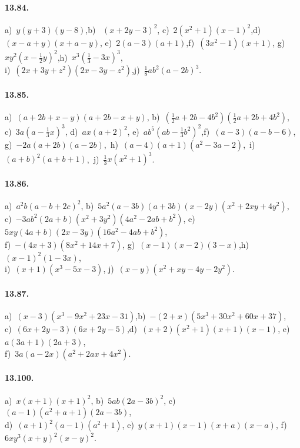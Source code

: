 \paragraph{13.84.} a)~$y(y+3)(y-8)$,\quad b)~ $(x+2y-3)^{2}$,\quad
c)~$2(x^{2}+1)(x-1)^{2}$,\quad d)~$(x-a+y)(x+a-y)$,\quad
e)~$2(a-3)(a+1)$,\quad f)~$(3x^{2}-1)(x+1)$,\quad
g)~$xy^{2}(x-\frac{1}{2}y)^{2}$,\quad h)~$x^{3}\left(\frac{1}{3}-3x\right)^{3}$,\protect\\
i)~$(2x+3y+z^{2})(2x-3y-z^{2})$,\quad j)~$\frac{1}{8}{ab}^{2}(a-2b)^{3}$.

\paragraph{13.85.} a)~$(a+2b+x-y)(a+2b-x+y)$,\quad 
b)~$\left(\frac{1}{2}a+2b-4b^{2}\right)\left(\frac{1}{2}a+2b+4b^{2}\right)$,\protect\\
c)~$3a\left(a-\frac{1}{3}x\right)^{3}$,\quad
d)~$ax(a+2)^{2}$,\quad
e)~${ab}^{5}\left({ab}-\frac{1}{3}b^{2}\right)^{2}$,\quad f)~$(a-3)(a-b-6)$,\protect\\
g)~$-2a(a+2b)(a-2b)$,\,
h)~$(a-4)(a+1)(a^{2}-3a-2)$,\,
i)~$(a+b)^{2}(a+b+1)$,\, j)~$\frac{1}{3}x(x^{2}+1)^{3}$.

\paragraph{13.86.} a)~$a^{2}b(a-b+2c)^{2}$,\quad 
b)~$5a^{2}(a-3b)(a+3b)(x-2y)(x^{2}+2xy+4y^{2})$,\protect\\
c)~$-3{ab}^{2}(2a+b)(x^{2}+3y^{2})(4a^{2}-2{ab}+b^{2})$,\quad %
e)~$5xy(4a+b)(2x-3y)(16a^{2}-4{ab}+b^{2})$,\protect\\
f)~$-(4x+3)(8x^{2}+14x+7)$,\quad
g)~$(x-1)(x-2)(3-x)$,\quad h)~$(x-1)^{2}(1-3x)$,\protect\\
i)~$(x+1)(x^{3}-5x-3)$,\quad
j)~$(x-y)(x^{2}+xy-4y-2y^{2})$.

\paragraph{13.87.} a)~$(x-3)(x^{3}-9x^{2}+23x-31)$,\quad b)~$-(2+x)(5x^{3}+30x^{2}+60x+37)$,\protect\\
c)~$(6x+2y-3)(6x+2y-5)$,\quad d)~$(x+2)\left(x^{2}+1\right)(x+1)(x-1)$,\quad
e)~$a(3a+1)(2a+3)$,\protect\\ f)~$3a(a-2x)\left(a^{2}+2ax+4x^{2}\right)$.

\paragraph{13.100.}
a)~$x(x+1)(x+1)^{2}$,\quad 
b)~$5ab(2a-3b)^{2}$,\quad 
c)~$(a-1)\left(a^{2}+a+1\right)(2a-3b)$,\protect\\
d)~$(a+1)^{2}(a-1)\left(a^{2}+1\right)$,\quad 
e)~$y(x+1)(x-1)(x+a)(x-a)$,\quad 
f)~$6xy^{3}(x+y)^{2}(x-y)^{2}$.

